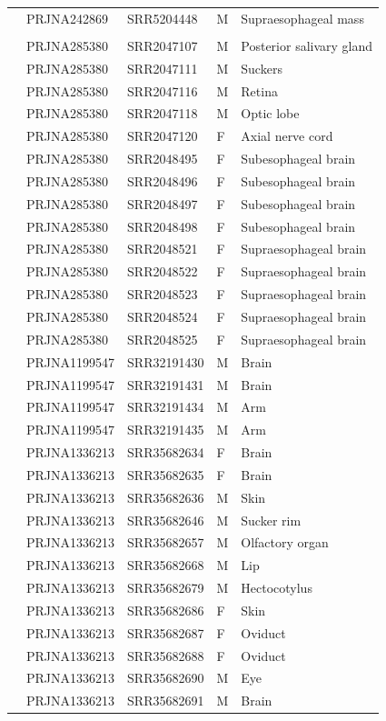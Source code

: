 \documentclass[12pt]{article}
\begin{document}
\begin{longtable}{lllll}
 & PRJNA242869 & SRR5204448 & M & Supraesophageal mass \\
\addlinespace[4pt]
\multicolumn{5}{l}{\textit{Octopus bimaculoides} (15F, 15M)} \\
\addlinespace[2pt]
 & PRJNA285380 & SRR2047107 & M & Posterior salivary gland \\
 & PRJNA285380 & SRR2047111 & M & Suckers \\
 & PRJNA285380 & SRR2047116 & M & Retina \\
 & PRJNA285380 & SRR2047118 & M & Optic lobe \\
 & PRJNA285380 & SRR2047120 & F & Axial nerve cord \\
 & PRJNA285380 & SRR2048495 & F & Subesophageal brain \\
 & PRJNA285380 & SRR2048496 & F & Subesophageal brain \\
 & PRJNA285380 & SRR2048497 & F & Subesophageal brain \\
 & PRJNA285380 & SRR2048498 & F & Subesophageal brain \\
 & PRJNA285380 & SRR2048521 & F & Supraesophageal brain \\
 & PRJNA285380 & SRR2048522 & F & Supraesophageal brain \\
 & PRJNA285380 & SRR2048523 & F & Supraesophageal brain \\
 & PRJNA285380 & SRR2048524 & F & Supraesophageal brain \\
 & PRJNA285380 & SRR2048525 & F & Supraesophageal brain \\
 & PRJNA1199547 & SRR32191430 & M & Brain \\
 & PRJNA1199547 & SRR32191431 & M & Brain \\
 & PRJNA1199547 & SRR32191434 & M & Arm \\
 & PRJNA1199547 & SRR32191435 & M & Arm \\
 & PRJNA1336213 & SRR35682634 & F & Brain \\
 & PRJNA1336213 & SRR35682635 & F & Brain \\
 & PRJNA1336213 & SRR35682636 & M & Skin \\
 & PRJNA1336213 & SRR35682646 & M & Sucker rim \\
 & PRJNA1336213 & SRR35682657 & M & Olfactory organ \\
 & PRJNA1336213 & SRR35682668 & M & Lip \\
 & PRJNA1336213 & SRR35682679 & M & Hectocotylus \\
 & PRJNA1336213 & SRR35682686 & F & Skin \\
 & PRJNA1336213 & SRR35682687 & F & Oviduct \\
 & PRJNA1336213 & SRR35682688 & F & Oviduct \\
 & PRJNA1336213 & SRR35682690 & M & Eye \\
 & PRJNA1336213 & SRR35682691 & M & Brain \\
\end{longtable}
\end{document}
